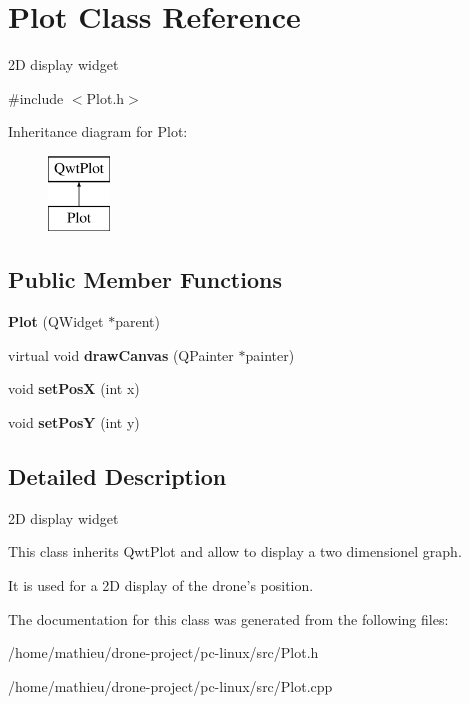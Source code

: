 \hypertarget{classPlot}{\section{Plot Class Reference}
\label{classPlot}
}


2\-D display widget  




{\ttfamily \#include $<$Plot.\-h$>$}

Inheritance diagram for Plot\-:\begin{figure}[H]
\begin{center}
\leavevmode
\includegraphics[height=2.000000cm]{classPlot}
\end{center}
\end{figure}
\subsection*{Public Member Functions}
\begin{DoxyCompactItemize}
\item 
\hypertarget{classPlot_a5eace135e8f9b8c0bd89e2b0e24f1387}{{\bfseries Plot} (Q\-Widget $\ast$parent)}\label{classPlot_a5eace135e8f9b8c0bd89e2b0e24f1387}

\item 
\hypertarget{classPlot_a3bc3ac75ac24d391b15df0a5f1f9b4e4}{virtual void {\bfseries draw\-Canvas} (Q\-Painter $\ast$painter)}\label{classPlot_a3bc3ac75ac24d391b15df0a5f1f9b4e4}

\item 
\hypertarget{classPlot_af2a97dc7b52d3adfd23b199e1c318caf}{void {\bfseries set\-Pos\-X} (int x)}\label{classPlot_af2a97dc7b52d3adfd23b199e1c318caf}

\item 
\hypertarget{classPlot_ad85fa5495b49b1bdda900df70bc20183}{void {\bfseries set\-Pos\-Y} (int y)}\label{classPlot_ad85fa5495b49b1bdda900df70bc20183}

\end{DoxyCompactItemize}


\subsection{Detailed Description}
2\-D display widget 

This class inherits Qwt\-Plot and allow to display a two dimensionel graph. \par
It is used for a 2\-D display of the drone's position. 

The documentation for this class was generated from the following files\-:\begin{DoxyCompactItemize}
\item 
/home/mathieu/drone-\/project/pc-\/linux/src/Plot.\-h\item 
/home/mathieu/drone-\/project/pc-\/linux/src/Plot.\-cpp\end{DoxyCompactItemize}
